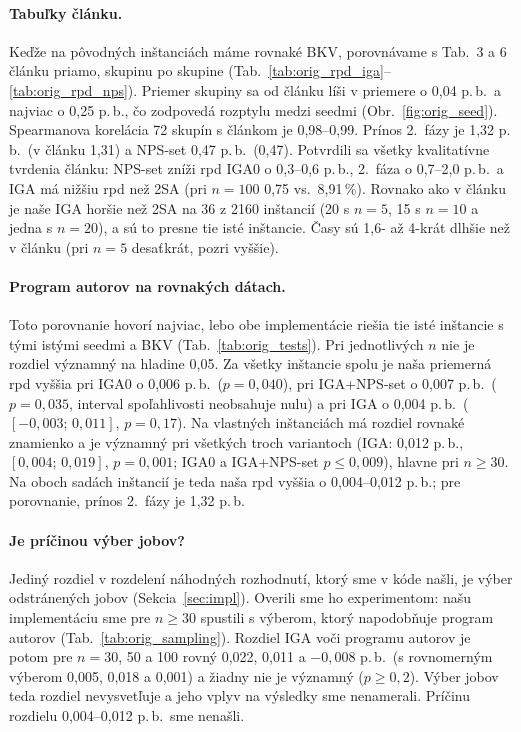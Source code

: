 \documentclass[11pt,a4paper]{article}
\begin{document}
\paragraph{Tabuľky článku.} Keďže na pôvodných inštanciách máme rovnaké BKV, porovnávame
s Tab.~3 a 6 článku priamo, skupinu po skupine
(Tab.~\ref{tab:orig_rpd_iga}--\ref{tab:orig_rpd_nps}). Priemer skupiny sa od článku líši
v priemere o 0,04 p.\,b.\ a najviac o 0,25 p.\,b., čo zodpovedá rozptylu medzi seedmi
(Obr.~\ref{fig:orig_seed}). Spearmanova korelácia 72 skupín s článkom je 0,98--0,99. Prínos 2.~fázy je 1,32 p.\,b.\ (v článku 1,31) a NPS-set 0,47 p.\,b.\ (0,47).
Potvrdili sa všetky kvalitatívne tvrdenia článku: NPS-set zníži rpd IGA0 o 0,3--0,6 p.\,b.,
2.~fáza o 0,7--2,0 p.\,b.\ a IGA má nižšiu rpd než 2SA (pri $n=100$ 0,75 vs.\ 8,91\,\%). Rovnako ako v článku je naše IGA horšie než 2SA na 36 z 2160 inštancií (20 s $n=5$, 15 s $n=10$
a jedna s $n=20$), a sú to presne tie isté inštancie. Časy sú 1,6- až 4-krát dlhšie než v článku (pri $n=5$ desaťkrát, pozri vyššie).

\paragraph{Program autorov na rovnakých dátach.} Toto porovnanie hovorí najviac, lebo obe
implementácie riešia tie isté inštancie s tými istými seedmi a BKV (Tab.~\ref{tab:orig_tests}).
Pri jednotlivých $n$ nie je rozdiel významný na hladine 0,05. Za všetky inštancie spolu je
naša priemerná rpd vyššia pri IGA0 o 0,006 p.\,b.\ ($p=0{,}040$), pri IGA+NPS-set
o 0,007 p.\,b.\ ($p=0{,}035$, interval spoľahlivosti neobsahuje nulu) a pri IGA o 0,004 p.\,b.\
($[-0{,}003;\,0{,}011]$, $p=0{,}17$). Na vlastných inštanciách má rozdiel rovnaké znamienko
a je významný pri všetkých troch variantoch (IGA: 0,012 p.\,b., $[0{,}004;\,0{,}019]$, $p=0{,}001$;
IGA0 a IGA+NPS-set $p\le 0{,}009$), hlavne pri $n\ge 30$. Na oboch sadách inštancií je teda
naša rpd vyššia o 0,004--0,012 p.\,b.; pre porovnanie, prínos 2.~fázy je 1,32 p.\,b.



\paragraph{Je príčinou výber jobov?} Jediný rozdiel v rozdelení náhodných rozhodnutí, ktorý sme
v kóde našli, je výber odstránených jobov (Sekcia~\ref{sec:impl}). Overili sme ho experimentom:
našu implementáciu sme pre $n\ge 30$ spustili s výberom, ktorý napodobňuje program autorov
(Tab.~\ref{tab:orig_sampling}). Rozdiel IGA voči programu autorov je potom pre $n=30$, 50
a 100 rovný 0,022, 0,011 a $-0{,}008$ p.\,b.\ (s rovnomerným výberom 0,005, 0,018 a 0,001)
a žiadny nie je významný ($p\ge 0{,}2$). Výber jobov teda rozdiel nevysvetľuje a jeho vplyv
na výsledky sme nenamerali. Príčinu rozdielu 0,004--0,012 p.\,b.\ sme nenašli.
\end{document}
